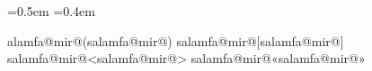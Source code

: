 \newdimen\salamfa@unit \salamfa@unit=0.5em
\newdimen\salamfa@spw  \salamfa@spw=0.4em
\newcount\salamfa@lead
\newcount\salamfa@nlines
\newcount\salamfa@c
\newcount\salamfa@mode      %
\newcount\salamfa@qchar
\newcount\salamfa@spc
\newcount\salamfa@ctx       %
\newcount\salamfa@signc
\newif\ifsalamfa@out
\newif\ifsalamfa@lineP
\newif\ifsalamfa@started
\newif\ifsalamfa@esc
\newif\ifsalamfa@dotp
\newif\ifsalamfa@slashp
\newif\ifsalamfa@starp
\newif\ifsalamfa@lastsig
\newif\ifsalamfa@wP
\newif\ifsalamfa@wF
\newif\ifsalamfa@wnum
\newif\ifsalamfa@isl
\newif\ifsalamfa@leadcmt
\newcommand{\salamfa@code}{}
\def\salamfa@SP{\salamfa@SP}
\def\salamfa@END{\salamfa@END}
\protected\def\salamfa@end{}
\def\salamfa@endmac{\salamfa@end}

\def\salamfa@gapp#1#2{\xdef#1{\unexpanded\expandafter{#1}\unexpanded{#2}}}
\def\salamfa@xapp#1#2{\edef\salamfa@t{#2}%
  \expandafter\salamfa@gapp\expandafter#1\expandafter{\salamfa@t}}

\def\salamfa@classof#1{%
  \salamfa@c\z@
  \ifnum`#1<128
    \ifnum`#1>47 \ifnum`#1<58 \salamfa@c\tw@\fi\fi
    \ifnum`#1>64 \ifnum`#1<91 \salamfa@c\@ne\fi\fi
    \ifnum`#1>96 \ifnum`#1<123 \salamfa@c\@ne\fi\fi
    \ifnum`#1=95 \salamfa@c\@ne\fi
  \else\ifnum`#1<1536
    \salamfa@c\@ne
    \ifnum`#1=171 \salamfa@c5 \fi
    \ifnum`#1=187 \salamfa@c5 \fi
  \else\ifnum`#1<1792
    \salamfa@c\thr@@
    \ifnum`#1>1775 \ifnum`#1<1786 \salamfa@c4 \fi\fi
    \ifnum`#1>1631 \ifnum`#1<1642 \salamfa@c4 \fi\fi
    \ifnum`#1=1548 \salamfa@c5 \fi
    \ifnum`#1=1563 \salamfa@c5 \fi
    \ifnum`#1=1567 \salamfa@c5 \fi
    \ifnum`#1>1641 \ifnum`#1<1646 \salamfa@c5 \fi\fi
    \ifnum`#1=1748 \salamfa@c5 \fi
  \else\ifnum`#1<8192
    \salamfa@c\@ne
  \else\ifnum`#1<8304
    \salamfa@c5
    \ifnum`#1=8204 \salamfa@c\thr@@\fi
    \ifnum`#1=8205 \salamfa@c\thr@@\fi
  \else\ifnum`#1<64336
    \salamfa@c5
  \else\ifnum`#1<65280
    \salamfa@c\thr@@
  \else
    \salamfa@c5
  \fi\fi\fi\fi\fi\fi\fi}

\edef\salamfa@lb{\expandafter\@gobble\string\{}
\edef\salamfa@rb{\expandafter\@gobble\string\}}
\def\salamfa@defmir#1#2{\expandafter\xdef\csname salamfa@mir@#1\endcsname{#2}}
\salamfa@defmir{(}{)}\salamfa@defmir{)}{(} %
\salamfa@defmir{[}{]}\salamfa@defmir{]}{[}
\salamfa@defmir{<}{>}\salamfa@defmir{>}{<}
\salamfa@defmir{«}{»}\salamfa@defmir{»}{«}
\expandafter\salamfa@defmir\expandafter{\salamfa@lb}{\salamfa@rb}
\expandafter\salamfa@defmir\expandafter{\salamfa@rb}{\salamfa@lb}

